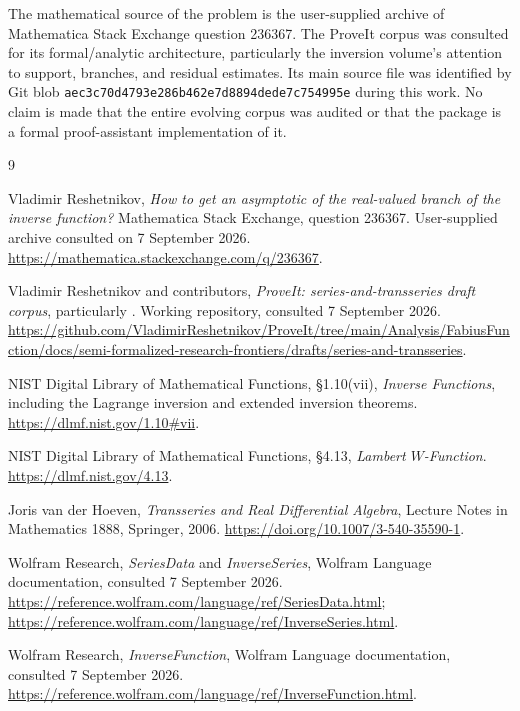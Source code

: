 \documentclass[11pt,a4paper]{article}
\numberwithin{equation}{section}
\theoremstyle{definition}
\theoremstyle{remark}
\begin{document}
The mathematical source of the problem is the user-supplied archive of
Mathematica Stack Exchange question 236367. The ProveIt corpus was consulted
for its formal/analytic architecture, particularly the inversion volume's
attention to support, branches, and residual estimates. Its main source
file was identified by Git blob
\texttt{aec3c70d4793e286b462e7d8894dede7c754995e} during this work. No claim
is made that the entire evolving corpus was audited or that the package
is a formal proof-assistant implementation of it.

\clearpage
\begin{thebibliography}{9}

Vladimir Reshetnikov,
\emph{How to get an asymptotic of the real-valued branch of the inverse function?}
Mathematica Stack Exchange, question 236367.
User-supplied archive consulted on 7 September 2026.
\url{https://mathematica.stackexchange.com/q/236367}.

Vladimir Reshetnikov and contributors,
\emph{ProveIt: series-and-transseries draft corpus}, particularly
.
Working repository, consulted 7 September 2026.
\url{https://github.com/VladimirReshetnikov/ProveIt/tree/main/Analysis/FabiusFunction/docs/semi-formalized-research-frontiers/drafts/series-and-transseries}.

NIST Digital Library of Mathematical Functions,
\S1.10(vii), \emph{Inverse Functions}, including the Lagrange inversion
and extended inversion theorems.
\url{https://dlmf.nist.gov/1.10#vii}.

NIST Digital Library of Mathematical Functions,
\S4.13, \emph{Lambert $W$-Function}.
\url{https://dlmf.nist.gov/4.13}.

Joris van der Hoeven,
\emph{Transseries and Real Differential Algebra},
Lecture Notes in Mathematics 1888, Springer, 2006.
\url{https://doi.org/10.1007/3-540-35590-1}.

Wolfram Research,
\emph{SeriesData} and \emph{InverseSeries}, Wolfram Language documentation,
consulted 7 September 2026.
\url{https://reference.wolfram.com/language/ref/SeriesData.html};
\url{https://reference.wolfram.com/language/ref/InverseSeries.html}.

Wolfram Research,
\emph{InverseFunction}, Wolfram Language documentation,
consulted 7 September 2026.
\url{https://reference.wolfram.com/language/ref/InverseFunction.html}.

\end{thebibliography}
\end{document}
